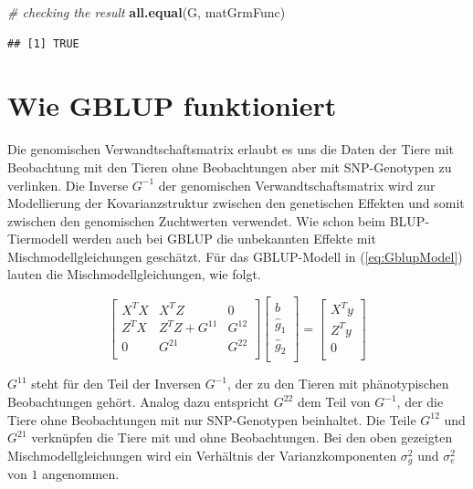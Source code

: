 \documentclass[]{book}
\newenvironment{Shaded}{\begin{snugshade}}{\end{snugshade}}
\newcommand{\KeywordTok}[1]{\textcolor[rgb]{0.13,0.29,0.53}{\textbf{{#1}}}}
\newcommand{\CommentTok}[1]{\textcolor[rgb]{0.56,0.35,0.01}{\textit{{#1}}}}
\newcommand{\NormalTok}[1]{{#1}}
\begin{document}
\begin{Shaded}
\begin{Highlighting}[]
\CommentTok{# checking the result}
\KeywordTok{all.equal}\NormalTok{(G, matGrmFunc)}
\end{Highlighting}
\end{Shaded}

\begin{verbatim}
## [1] TRUE
\end{verbatim}

\section{Wie GBLUP funktioniert}\label{wie-gblup-funktioniert}

Die genomischen Verwandtschaftsmatrix erlaubt es uns die Daten der Tiere
mit Beobachtung mit den Tieren ohne Beobachtungen aber mit SNP-Genotypen
zu verlinken. Die Inverse \(G^{-1}\) der genomischen
Verwandtschaftsmatrix wird zur Modellierung der Kovarianzstruktur
zwischen den genetischen Effekten und somit zwischen den genomischen
Zuchtwerten verwendet. Wie schon beim BLUP-Tiermodell werden auch bei
GBLUP die unbekannten Effekte mit Mischmodellgleichungen geschätzt. Für
das GBLUP-Modell in (\ref{eq:GblupModel}) lauten die
Mischmodellgleichungen, wie folgt.

\[\left[
\begin{array}{lll}
  X^TX & X^TZ & 0 \\ 
  Z^TX & Z^TZ + G^{11} & G^{12} \\ 
  0 & G^{21} & G^{22} \\ 
  \end{array}\right]
\left[
\begin{array}{l}
  \hat{b} \\ 
  \hat{g}_1 \\ 
  \hat{g}_2 \\ 
  \end{array}\right]
 = \left[
\begin{array}{l}
  X^Ty \\ 
  Z^Ty \\ 
  0 \\ 
  \end{array}\right]
\]

\(G^{11}\) steht für den Teil der Inversen \(G^{-1}\), der zu den Tieren
mit phänotypischen Beobachtungen gehört. Analog dazu entspricht
\(G^{22}\) dem Teil von \(G^{-1}\), der die Tiere ohne Beobachtungen mit
nur SNP-Genotypen beinhaltet. Die Teile \(G^{12}\) und \(G^{21}\)
verknüpfen die Tiere mit und ohne Beobachtungen. Bei den oben gezeigten
Mischmodellgleichungen wird ein Verhältnis der Varianzkomponenten
\(\sigma_g^2\) und \(\sigma_e^2\) von \(1\) angenommen.
\end{document}
